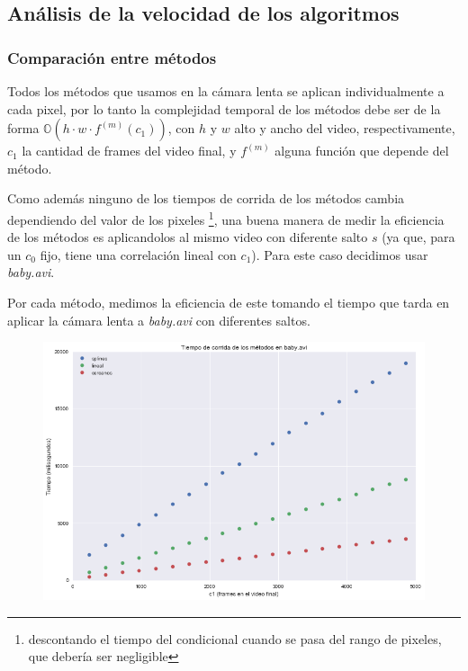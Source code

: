 \subsection{An\'alisis de la velocidad de los algoritmos}

\subsubsection{Comparaci\'on entre m\'etodos}

Todos los m\'etodos que usamos en la c\'amara lenta se aplican individualmente a
cada pixel, por lo tanto la complejidad temporal de los m\'etodos debe ser de la
forma $ \mathbb{O}(h \cdot w \cdot f^{(m)}(c_1)) $, con $h$ y $w$ alto y ancho del
video, respectivamente, $c_1$ la cantidad de frames del video final, y $f^{(m)}$
alguna funci\'on que depende del m\'etodo.

Como adem\'as ninguno de los tiempos de corrida de los m\'etodos cambia
dependiendo del valor de los pixeles \footnote{descontando el tiempo del
condicional cuando se pasa del rango de pixeles, que deber\'ia ser negligible},
una buena manera de medir la eficiencia de los m\'etodos es aplicandolos al
mismo video con diferente salto $s$ (ya que, para un $c_0$ fijo, tiene una
correlaci\'on lineal con $c_1$). Para este caso decidimos usar
\textit{baby.avi}.

Por cada m\'etodo, medimos la eficiencia de este tomando el tiempo que
tarda en aplicar la c\'amara lenta a \textit{baby.avi} con diferentes saltos.

\begin{figure}[H]
\centering
\includegraphics[width=.95\textwidth]{graficos/tiempo_baby.png}
\end{figure}

